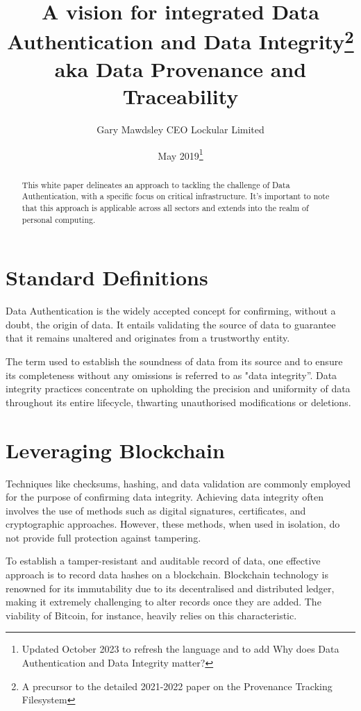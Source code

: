 \documentclass{tufte-handout}
\title{A vision for integrated Data Authentication and Data Integrity\thanks{A precursor to the detailed 2021-2022 paper on the Provenance Tracking Filesystem} \\
\large aka Data Provenance and Traceability}
\author[Gary Mawdsley]{Gary Mawdsley CEO Lockular Limited}
\date{May 2019\thanks{Updated October 2023 to refresh the language and to add Why does Data Authentication and Data Integrity matter?}}  %
\begin{document}
\maketitle%

\begin{abstract}
\noindent This white paper delineates an approach to tackling the challenge of Data Authentication, with a specific focus on critical infrastructure.
It's important to note that this approach is applicable across all sectors and extends into the realm of personal computing.

\end{abstract}

{}

\section{Standard Definitions}\label{sec:page-layout}
Data Authentication is the widely accepted concept for confirming, without a doubt, the origin of data. It entails validating the source of data to guarantee that it remains unaltered and originates
from a trustworthy entity.

The term used to establish the soundness of data from its source and to ensure its completeness without any omissions is referred to as "data integrity”. Data integrity practices concentrate on
upholding the precision and uniformity of data throughout its entire lifecycle, thwarting unauthorised modifications or deletions.

\section{Leveraging Blockchain}\label{sec:page-layout}
Techniques like checksums, hashing, and data validation are commonly employed for the purpose of confirming data integrity. Achieving data integrity often involves the use of methods such as digital
signatures, certificates, and cryptographic approaches. However, these methods, when used in isolation, do not provide full protection against tampering.

To establish a tamper-resistant and auditable record of data, one effective approach is to record data hashes on a blockchain. Blockchain technology is renowned for its immutability due to its
decentralised and distributed ledger, making it extremely challenging to alter records once they are added. The viability of Bitcoin, for instance, heavily relies on this characteristic.
\end{document}
